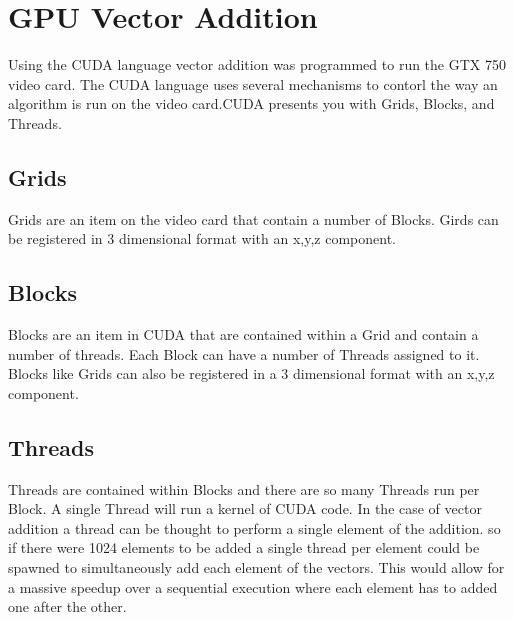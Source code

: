 \documentclass[letterpaper,twocolumn]{article}
\begin{document}
\section{GPU Vector Addition}
Using the CUDA language vector addition was programmed to run the GTX 750 video card. The CUDA language uses several mechanisms to contorl the way an algorithm is run on the video card.CUDA presents you with Grids, Blocks, and Threads.
\subsection{Grids}
Grids are an item on the video card that contain a number of Blocks. Girds can be registered in 3 dimensional format with an x,y,z component.
\subsection{Blocks}
Blocks are an item in CUDA that are contained within a Grid and contain a number of threads. Each Block can have a number of Threads assigned to it. Blocks like Grids can also be registered in a 3 dimensional format with an x,y,z component.
\subsection{Threads}
Threads are contained within Blocks and there are so many Threads run per Block. A single Thread will run a kernel of CUDA code. In the case of vector addition a thread can be thought to perform a single element of the addition. so if there were 1024 elements to be added a single thread per element could be spawned to simultaneously add each element of the vectors. This would allow for a massive speedup over a sequential execution where each element has to added one after the other.
\end{document}
